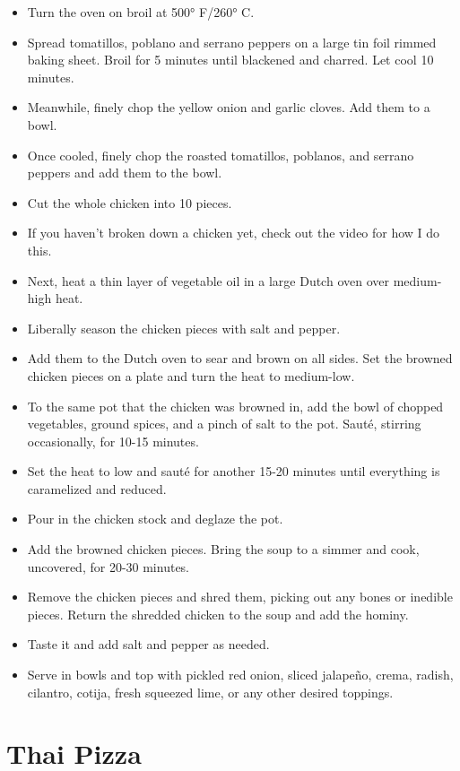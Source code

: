 \documentclass[
  letterpaper,
  DIV=11,
  numbers=noendperiod,
  titlepage=false]{scrreprt}
\providecommand{\tightlist}{%
  \setlength{\itemsep}{0pt}\setlength{\parskip}{0pt}}\usepackage{longtable,booktabs,array}
\begin{document}
\begin{itemize}
\tightlist
\item
  Turn the oven on broil at 500° F/260° C.
\item
  Spread tomatillos, poblano and serrano peppers on a large tin foil
  rimmed baking sheet. Broil for 5 minutes until blackened and charred.
  Let cool 10 minutes.
\item
  Meanwhile, finely chop the yellow onion and garlic cloves. Add them to
  a bowl.
\item
  Once cooled, finely chop the roasted tomatillos, poblanos, and serrano
  peppers and add them to the bowl.
\item
  Cut the whole chicken into 10 pieces.
\item
  If you haven't broken down a chicken yet, check out the video for how
  I do this.
\item
  Next, heat a thin layer of vegetable oil in a large Dutch oven over
  medium-high heat.
\item
  Liberally season the chicken pieces with salt and pepper.
\item
  Add them to the Dutch oven to sear and brown on all sides. Set the
  browned chicken pieces on a plate and turn the heat to medium-low.
\item
  To the same pot that the chicken was browned in, add the bowl of
  chopped vegetables, ground spices, and a pinch of salt to the pot.
  Sauté, stirring occasionally, for 10-15 minutes.
\item
  Set the heat to low and sauté for another 15-20 minutes until
  everything is caramelized and reduced.
\item
  Pour in the chicken stock and deglaze the pot.
\item
  Add the browned chicken pieces. Bring the soup to a simmer and cook,
  uncovered, for 20-30 minutes.
\item
  Remove the chicken pieces and shred them, picking out any bones or
  inedible pieces. Return the shredded chicken to the soup and add the
  hominy.
\item
  Taste it and add salt and pepper as needed.
\item
  Serve in bowls and top with pickled red onion, sliced jalapeño, crema,
  radish, cilantro, cotija, fresh squeezed lime, or any other desired
  toppings.
\end{itemize}


\chapter{Thai Pizza}\label{thai-pizza}
\end{document}
